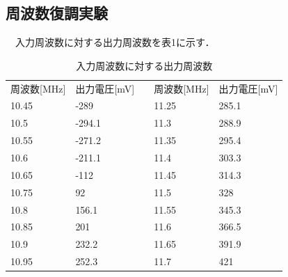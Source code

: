 \subsection{周波数復調実験}
　入力周波数に対する出力周波数を表1に示す．

\begin{table}[H]
  \centering
  \caption{入力周波数に対する出力周波数}
  \begin{tabular}{|l|l|lll}
  \cline{1-2} \cline{4-5}
  周波数{[}MHz{]} & 出力電圧{[}mV{]} & \multicolumn{1}{l|}{} & \multicolumn{1}{l|}{周波数{[}MHz{]}} & \multicolumn{1}{l|}{出力電圧{[}mV{]}} \\ \cline{1-2} \cline{4-5}
  10.45        & -289         & \multicolumn{1}{l|}{} & \multicolumn{1}{l|}{11.25}        & \multicolumn{1}{l|}{285.1}        \\ \cline{1-2} \cline{4-5}
  10.5         & -294.1       & \multicolumn{1}{l|}{} & \multicolumn{1}{l|}{11.3}         & \multicolumn{1}{l|}{288.9}        \\ \cline{1-2} \cline{4-5}
  10.55        & -271.2       & \multicolumn{1}{l|}{} & \multicolumn{1}{l|}{11.35}        & \multicolumn{1}{l|}{295.4}        \\ \cline{1-2} \cline{4-5}
  10.6         & -211.1       & \multicolumn{1}{l|}{} & \multicolumn{1}{l|}{11.4}         & \multicolumn{1}{l|}{303.3}        \\ \cline{1-2} \cline{4-5}
  10.65        & -112         & \multicolumn{1}{l|}{} & \multicolumn{1}{l|}{11.45}        & \multicolumn{1}{l|}{314.3}        \\ \cline{1-2} \cline{4-5}
  10.75        & 92           & \multicolumn{1}{l|}{} & \multicolumn{1}{l|}{11.5}         & \multicolumn{1}{l|}{328}          \\ \cline{1-2} \cline{4-5}
  10.8         & 156.1        & \multicolumn{1}{l|}{} & \multicolumn{1}{l|}{11.55}        & \multicolumn{1}{l|}{345.3}        \\ \cline{1-2} \cline{4-5}
  10.85        & 201          & \multicolumn{1}{l|}{} & \multicolumn{1}{l|}{11.6}         & \multicolumn{1}{l|}{366.5}        \\ \cline{1-2} \cline{4-5}
  10.9         & 232.2        & \multicolumn{1}{l|}{} & \multicolumn{1}{l|}{11.65}        & \multicolumn{1}{l|}{391.9}        \\ \cline{1-2} \cline{4-5}
  10.95        & 252.3        & \multicolumn{1}{l|}{} & \multicolumn{1}{l|}{11.7}         & \multicolumn{1}{l|}{421}          \\ \cline{1-2} \cline{4-5}

\end{tabular}
\end{table}
